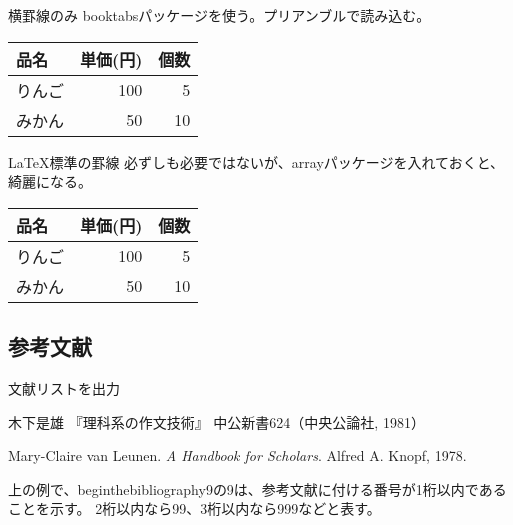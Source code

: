 \documentclass{article}
\begin{document}
横罫線のみ
booktabsパッケージを使う。プリアンブルで読み込む。
\begin{center}
  \begin{tabular}{lrr} \toprule
    品名 & 単価(円) & 個数 \\ \midrule
    りんご & 100 & 5 \\
    みかん & 50 & 10 \\ \bottomrule
  \end{tabular}
\end{center}

\LaTeX 標準の罫線
必ずしも必要ではないが、arrayパッケージを入れておくと、綺麗になる。
\begin{center}
  \begin{tabular}{lrr} \hline
    品名 & 単価(円) & 個数 \\ \hline
    りんご & 100 & 5 \\
    みかん & 50 & 10 \\ \hline
  \end{tabular}
\end{center}

\subsection{参考文献}
文献リストを出力
\begin{thebibliography}{9}
\item
  木下是雄 『理科系の作文技術』
  中公新書624（中央公論社, 1981）
\item
  Mary-Claire van Leunen.
  \textit{A Handbook for Scholars}.
  Alfred A. Knopf, 1978.
\end{thebibliography}

上の例で、begin{thebibliography}{9}の9は、参考文献に付ける番号が1桁以内であることを示す。
2桁以内なら{99}、3桁以内なら{999}などと表す。
\end{document}
